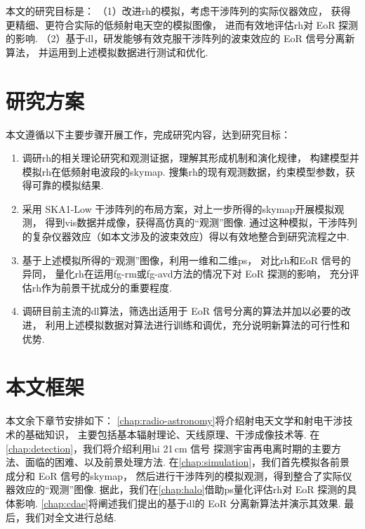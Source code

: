 本文的研究目标是：
（1）改进\ac{rh}的模拟，考虑干涉阵列的实际仪器效应，
获得更精细、更符合实际的低频射电天空的模拟图像，
进而有效地评估\ac{rh}对 EoR 探测的影响.
（2）基于\ac{dl}，研发能够有效克服干涉阵列的波束效应的 EoR 信号分离新算法，
并运用到上述模拟数据进行测试和优化.


\section{研究方案}

本文遵循以下主要步骤开展工作，完成研究内容，达到研究目标：
\begin{enumerate}
\item
调研\ac{rh}的相关理论研究和观测证据，理解其形成机制和演化规律，
构建模型并模拟\ac{rh}在低频射电波段的\ac{skymap}.
搜集\ac{rh}的现有观测数据，约束模型参数，获得可靠的模拟结果.

\item
采用 SKA1-Low 干涉阵列的布局方案，对上一步所得的\ac{skymap}开展模拟观测，
得到\ac{vis}数据并成像，获得高仿真的\enquote{观测}图像.
通过这种模拟，干涉阵列的复杂仪器效应（如本文涉及的波束效应）得以有效地整合到研究流程之中.

\item
基于上述模拟所得的\enquote{观测}图像，利用一维和二维\ac{ps}，
对比\ac{rh}和EoR 信号的异同，
量化\ac{rh}在运用\ac{fg-rm}或\ac{fg-avd}方法的情况下对 EoR 探测的影响，
充分评估\ac{rh}作为前景干扰成分的重要程度.

\item
调研目前主流的\ac{dl}算法，筛选出适用于 EoR 信号分离的算法并加以必要的改进，
利用上述模拟数据对算法进行训练和调优，充分说明新算法的可行性和优势.

\end{enumerate}


\section{本文框架}

本文余下章节安排如下：
\autoref{chap:radio-astronomy}将介绍射电天文学和射电干涉技术的基础知识，
主要包括基本辐射理论、天线原理、干涉成像技术等.
在\autoref{chap:detection}，我们将介绍利用\ac{hi} 21\,cm 信号
探测宇宙再电离时期的主要方法、面临的困难、以及前景处理方法.
在\autoref{chap:simulation}，我们首先模拟各前景成分和 EoR 信号的\ac{skymap}，
然后进行干涉阵列的模拟观测，得到整合了实际仪器效应的\enquote{观测}图像.
据此，我们在\autoref{chap:halo}借助\ac{ps}量化评估\ac{rh}对
EoR 探测的具体影响.
\autoref{chap:cdae}将阐述我们提出的基于\ac{dl}的 EoR 分离新算法并演示其效果.
最后，我们对全文进行总结.


